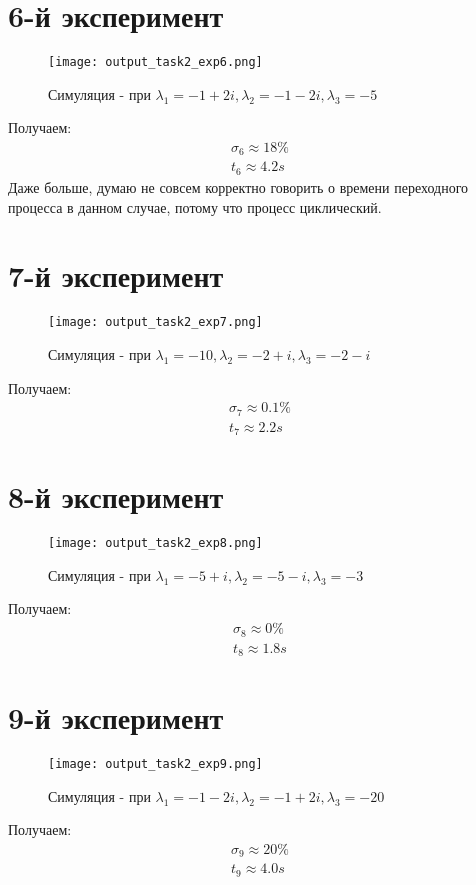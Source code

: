 \newpage
\section{6-й эксперимент}
\begin{figure}[ht]
    \centering
    \texttt{[image: output\_task2\_exp6.png]}
  \caption{Симуляция - при $\lambda_1 = -1 + 2i, \lambda_2 = -1 -2i,\lambda_3 = -5$}
\end{figure}
Получаем:
$$
\begin{aligned}
  \sigma_6 \approx 18\% \\
  t_6 \approx 4.2s
\end{aligned}
$$
Даже больше, думаю не совсем корректно говорить о времени переходного процесса в данном случае, потому что процесс циклический.

\newpage
\section{7-й эксперимент}
\begin{figure}[ht]
    \centering
    \texttt{[image: output\_task2\_exp7.png]}
  \caption{Симуляция - при $\lambda_1 = -10, \lambda_2 = -2 + i,\lambda_3 = -2 - i$}
\end{figure}
Получаем:
$$
\begin{aligned}
  \sigma_7 \approx 0.1\% \\
  t_7 \approx 2.2s
\end{aligned}
$$

\newpage
\section{8-й эксперимент}
\begin{figure}[ht]
    \centering
    \texttt{[image: output\_task2\_exp8.png]}
  \caption{Симуляция - при $\lambda_1 = -5 + i, \lambda_2 = -5 - i,\lambda_3 = -3$}
\end{figure}
Получаем:
$$
\begin{aligned}
  \sigma_8 \approx 0\% \\
  t_8 \approx 1.8s
\end{aligned}
$$

\newpage
\section{9-й эксперимент}
\begin{figure}[ht]
    \centering
    \texttt{[image: output\_task2\_exp9.png]}
  \caption{Симуляция - при $\lambda_1 = -1 -2i, \lambda_2 = -1 +2i,\lambda_3 = -20$}
\end{figure}
Получаем:
$$
\begin{aligned}
  \sigma_9 \approx 20\% \\
  t_9 \approx 4.0s
\end{aligned}
$$

